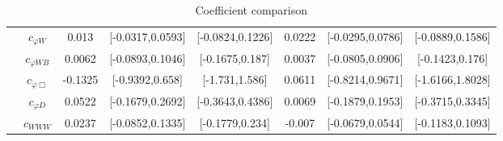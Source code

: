 \documentclass{article}
\begin{document}
\begin{table}[H]
\begin{tabular}{|c|c|c|c|c|c|c|c|}
 & $c_{\varphi W}$ & 0.013                             & [-0.0317,0.0593]                                 & [-0.0824,0.1226] & 0.0222                             & [-0.0295,0.0786]                                 & [-0.0889,0.1586] \\ \cline{2-8}
 & $c_{\varphi WB}$ & 0.0062                             & [-0.0893,0.1046]                                 & [-0.1675,0.187] & 0.0037                             & [-0.0805,0.0906]                                 & [-0.1423,0.176] \\ \cline{2-8}
 & $c_{\varphi \Box}$ & -0.1325                             & [-0.9392,0.658]                                 & [-1.731,1.586] & 0.0611                             & [-0.8214,0.9671]                                 & [-1.6166,1.8028] \\ \cline{2-8}
 & $c_{\varphi D}$ & 0.0522                             & [-0.1679,0.2692]                                 & [-0.3643,0.4386] & 0.0069                             & [-0.1879,0.1953]                                 & [-0.3715,0.3345] \\ \cline{2-8}
 & $c_{WWW}$ & 0.0237                             & [-0.0852,0.1335]                                 & [-0.1779,0.234] & -0.007                             & [-0.0679,0.0544]                                 & [-0.1183,0.1093] \\ \cline{2-8}
\hline
\end{tabular}
\caption{Coefficient comparison}
\end{table}
\end{document}

